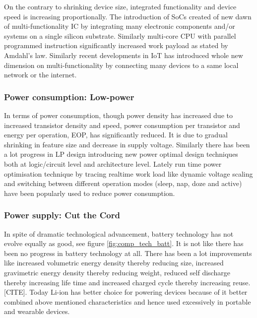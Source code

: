 \documentclass[UKenglish]{ifimaster}  %
\begin{document}
On the contrary to shrinking device size, integrated functionality and device speed is increasing proportionally. 
The introduction of SoCs created of new dawn of multi-functionality IC by integrating many electronic components 
and/or systems on a single silicon substrate. Similarly multi-core CPU with parallel programmed instruction  
significantly increased work payload as stated by Amdahl's law. Similarly recent developments in IoT has 
introduced whole new dimension on multi-functionality by connecting many devices to a same local network or 
the internet\cite{iot_intro}. \\

\subsubsection{Power consumption: Low-power}

In terms of power consumption, though power density has increased due to increased transistor density and speed, 
power consumption per transistor and energy per operation, EOP, has significantly reduced. It is due to gradual 
shrinking in feature size and decrease in supply voltage. Similarly there has been a lot progress in LP design 
introducing new power optimal design techniques both at logic/circuit level and architecture level. Lately run 
time power optimisation technique by tracing realtime work load like dynamic voltage scaling and switching 
between different operation modes (sleep, nap, doze and active) have been popularly used to reduce power 
consumption\cite{rabaey_2009}. \\


\subsubsection{Power supply: Cut the Cord}

In spite of dramatic technological advancement, battery technology has not evolve equally as good, see figure 
\ref{fig:comp_tech_batt}. It is not like there has been no progress in battery technology at all. There has been a lot improvements 
like increased volumetric energy density thereby reducing size, increased gravimetric energy density thereby 
reducing weight, reduced self discharge thereby increasing life time and increased charged cycle thereby 
increasing reuse.[CITE]. Today Li-ion has better choice for powering devices because of it better combined 
above mentioned characteristics and hence used excessively in portable and wearable devices. \\
\end{document}
